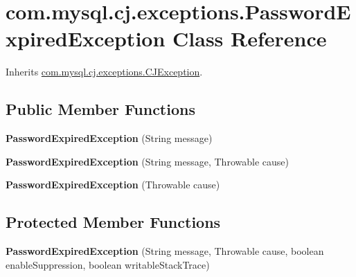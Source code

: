 \hypertarget{classcom_1_1mysql_1_1cj_1_1exceptions_1_1_password_expired_exception}{}\section{com.\+mysql.\+cj.\+exceptions.\+Password\+Expired\+Exception Class Reference}
\label{classcom_1_1mysql_1_1cj_1_1exceptions_1_1_password_expired_exception}


Inherits \mbox{\hyperlink{classcom_1_1mysql_1_1cj_1_1exceptions_1_1_c_j_exception}{com.\+mysql.\+cj.\+exceptions.\+C\+J\+Exception}}.

\subsection*{Public Member Functions}
\begin{DoxyCompactItemize}
\item 
\mbox{\label{classcom_1_1mysql_1_1cj_1_1exceptions_1_1_password_expired_exception_a52e87a9556ee15fcbf7e69b70b3a1561}} 
{\bfseries Password\+Expired\+Exception} (String message)
\item 
\mbox{\label{classcom_1_1mysql_1_1cj_1_1exceptions_1_1_password_expired_exception_ab361a6992f2ac423def739b32eb6009a}} 
{\bfseries Password\+Expired\+Exception} (String message, Throwable cause)
\item 
\mbox{\label{classcom_1_1mysql_1_1cj_1_1exceptions_1_1_password_expired_exception_a78248d7bc682dd450eeb1125e0ac24b9}} 
{\bfseries Password\+Expired\+Exception} (Throwable cause)
\end{DoxyCompactItemize}
\subsection*{Protected Member Functions}
\begin{DoxyCompactItemize}
\item 
\mbox{\label{classcom_1_1mysql_1_1cj_1_1exceptions_1_1_password_expired_exception_a2b380747747565c5cf7f6be986ca0b0a}} 
{\bfseries Password\+Expired\+Exception} (String message, Throwable cause, boolean enable\+Suppression, boolean writable\+Stack\+Trace)
\end{DoxyCompactItemize}
